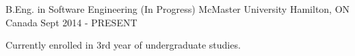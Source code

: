 


\begin{cventries}


\cventry
{B.Eng. in Software Engineering (In Progress)} %
{McMaster University} %
{Hamilton, ON Canada} %
{Sept 2014 - PRESENT} %
{ %
\begin{cvitems}
\item {Currently enrolled in 3rd year of undergraduate studies.}
\end{cvitems}
}


\end{cventries}